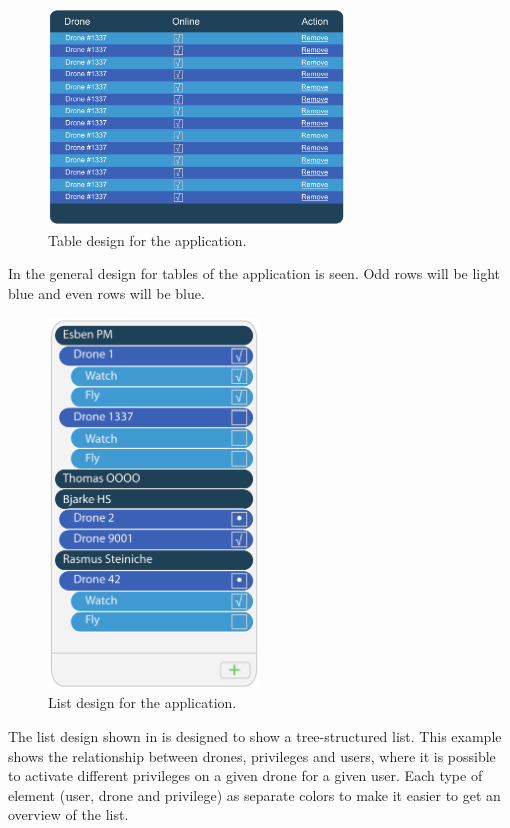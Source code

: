\begin{figure}[htb]
    \centering
    \includegraphics[width=0.7\textwidth]{gfx/table.pdf}
    \caption{Table design for the application.}
    \label{fig:table_design}
\end{figure}
In  the general design for tables of the application is seen.
Odd rows will be light blue and even rows will be blue.

\begin{figure}[htb]
    \centering
    \includegraphics[width=0.5\textwidth]{gfx/list.pdf}
    \caption{List design for the application.}
    \label{fig:list_design}
\end{figure}
The list design shown in  is designed to show a tree-structured list.
This example shows the relationship between drones, privileges and users, where it is possible to activate different privileges on a given drone for a given user.
Each type of element (user, drone and privilege) as separate colors to make it easier to get an overview of the list. \\

